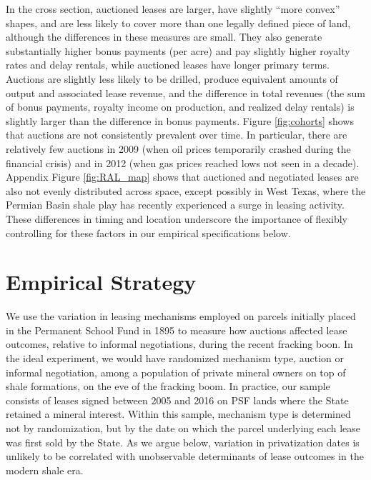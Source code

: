 \documentclass[12pt]{article}
\begin{document}
In the cross section, auctioned leases are larger, have slightly ``more convex'' shapes, and are less likely to cover more than one legally defined piece of land, although the differences in these measures are small. They also generate substantially higher bonus payments (per acre) and pay slightly higher royalty rates and delay rentals, while auctioned leases have longer primary terms. Auctions are slightly less likely to be drilled, produce equivalent amounts of output and associated lease revenue, and the difference in total revenues (the sum of bonus payments, royalty income on production, and realized delay rentals) is slightly larger than the difference in bonus payments.  Figure \ref{fig:cohorts} shows that auctions are not consistently prevalent over time.  In particular, there are relatively few auctions in 2009 (when oil prices temporarily crashed during the financial crisis) and in 2012 (when gas prices reached lows not seen in a decade).  Appendix Figure \ref{fig:RAL_map} shows that auctioned and negotiated leases are also not evenly distributed across space, except possibly in West Texas, where the Permian Basin shale play has recently experienced a surge in leasing activity.  These differences in timing and location underscore the importance of flexibly controlling for these factors in our empirical specifications below. 

\section{Empirical Strategy \label{sec:EmpiricalStrategy}}

We use the variation in leasing mechanisms employed on parcels initially placed in the Permanent School Fund in 1895 to measure how auctions affected lease outcomes, relative to informal negotiations, during the recent fracking boon. In the ideal experiment, we would have randomized mechanism type, auction or informal negotiation, among a population of private mineral owners on top of shale formations, on the eve of the fracking boom. In practice, our sample consists of leases signed between 2005 and 2016 on PSF lands where the State retained a mineral interest. Within this sample, mechanism type is determined not by randomization, but by the date on which the parcel underlying each lease was first sold by the State. As we argue below, variation in privatization dates is unlikely to be correlated with unobservable determinants of lease outcomes in the modern shale era.
\end{document}
